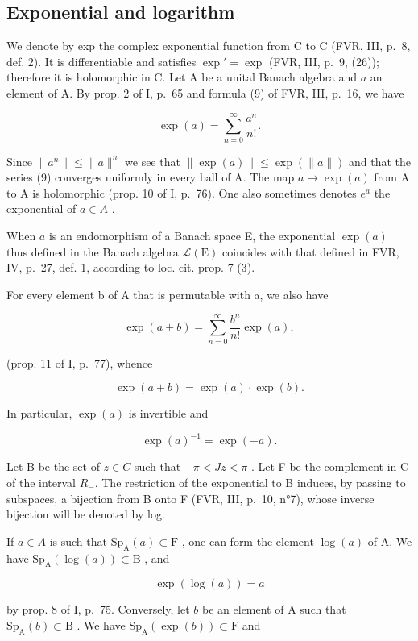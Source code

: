 \subsection{Exponential and logarithm}

We denote by exp the complex exponential function from C to C (FVR, III, p.~8, def. 2). It is differentiable and satisfies \(\exp' = \exp\) (FVR, III, p.~9, (26)); therefore it is holomorphic in C. Let A be a unital Banach algebra and \(a\) an element of A. By prop. 2 of I, p.~65 and formula (9) of FVR, III, p.~16, we have

\[
\exp (a) = \sum_ {n = 0} ^ {\infty} \frac {a ^ {n}}{n !}.\tag{9}
\]

Since \(\|a^{n}\|\leqslant\|a\|^{n}\) we see that \(\|\exp(a)\|\leqslant\exp(\|a\|)\) and that the series (9) converges uniformly in every ball of A. The map \(a\mapsto\exp(a)\) from A to A is holomorphic (prop. 10 of I, p.~76). One also sometimes denotes \(e^{a}\) the exponential of \(a\in A\) .

When \(a\) is an endomorphism of a Banach space E, the exponential \(\exp(a)\) thus defined in the Banach algebra \(\mathcal{L}(\mathrm{E})\) coincides with that defined in FVR, IV, p.~27, def. 1, according to loc. cit. prop. 7 (3).

For every element b of A that is permutable with a, we also have

\[
\exp (a + b) = \sum_ {n = 0} ^ {\infty} \frac {b ^ {n}}{n !} \exp (a),
\]

(prop. 11 of I, p.~77), whence

\[
\exp (a + b) = \exp (a) \cdot \exp (b).\tag{10}
\]

In particular, \(\exp(a)\) is invertible and

\[
\exp (a) ^ {- 1} = \exp (- a).\tag{11}
\]

Let B be the set of \(z \in C\) such that \(-\pi < Jz < \pi\) . Let F be the complement in C of the interval \(R_{-}\). The restriction of the exponential to B induces, by passing to subspaces, a bijection from B onto F (FVR, III, p.~10, n°7), whose inverse bijection will be denoted by log.

If \(a \in A\) is such that \(\mathrm{Sp}_{\mathrm{A}}(a) \subset \mathrm{F}\) , one can form the element \(\log(a)\) of A. We have \(\mathrm{Sp}_{\mathrm{A}}(\log(a)) \subset \mathrm{B}\) , and

\[
\exp (\log (a)) = a\tag{12}
\]

by prop. 8 of I, p.~75. Conversely, let \(b\) be an element of A such that \(\mathrm{Sp}_{\mathrm{A}}(b) \subset \mathrm{B}\) . We have \(\mathrm{Sp}_{\mathrm{A}}(\exp(b)) \subset \mathrm{F}\) and

